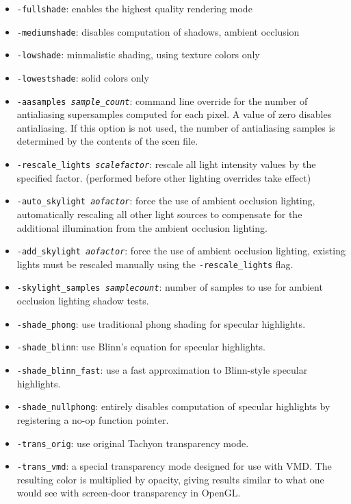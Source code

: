 \begin{itemize}
\item{{\tt -fullshade}}: enables the highest quality rendering mode
\item{{\tt -mediumshade}}: disables computation of shadows, ambient occlusion
\item{{\tt -lowshade}}: minmalistic shading, using texture colors only
\item{{\tt -lowestshade}}: solid colors only
\item{{\tt -aasamples {\it sample\_count}}}: command line override for the number of 
      antialiasing supersamples computed for each pixel.  A value of
      zero disables antialiasing.  If this option is not used, the number
      of antialiasing samples is determined by the contents of the scen file.
\item{{\tt -rescale\_lights {\it scalefactor}}}: 
                              rescale all light intensity values by the
                              specified factor.  (performed before other
                              lighting overrides take effect)
\item{{\tt -auto\_skylight {\it aofactor}}}: 
                              force the use of ambient occlusion lighting,
                              automatically rescaling all other light sources
                              to compensate for the additional illumination
                              from the ambient occlusion lighting.
\item{{\tt -add\_skylight {\it aofactor}}}:
                              force the use of ambient occlusion lighting,
                              existing lights must be rescaled manually using
                              the {\tt -rescale\_lights} flag.
\item{{\tt -skylight\_samples {\it samplecount}}}: 
                              number of samples to use for ambient occlusion
                              lighting shadow tests.
\item{{\tt -shade\_phong}}: use traditional phong shading for specular
      highlights.
\item{{\tt -shade\_blinn}}: use Blinn's equation for specular highlights.
\item{{\tt -shade\_blinn\_fast}}: use a fast approximation to Blinn-style
      specular highlights.
\item{{\tt -shade\_nullphong}}: entirely disables computation of
      specular highlights by registering a no-op function pointer.
\item{{\tt -trans\_orig}}: use original Tachyon transparency mode.
\item{{\tt -trans\_vmd}}: a special transparency mode designed for
      use with VMD.  The resulting color is multiplied by opacity, 
      giving results similar to what one would see with screen-door
      transparency in OpenGL.
\end{itemize}


